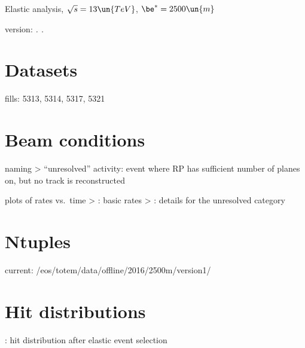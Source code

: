 


\def\baseDir{/afs/cern.ch/work/j/jkaspar/analyses/elastic/6500GeV/beta2500/4p/}


\centerline{\SetFontSizesXX Elastic analysis, $\sqrt s = 13\un{TeV}$, $\be^* = 2500\un{m}$ }
\vskip2mm
\centerline{version: {\it \number\day. \number\month. \number\year}}

\section{Datasets}

\> fills: 5313, 5314, 5317, 5321

\section{Beam conditions}

\> naming
\>> ``unresolved'' activity: event where RP has sufficient number of planes on, but no track is reconstructed

\> plots of rates vs.~time
\>> : basic rates
\>> : details for the unresolved category


\section{Ntuples}

\> current: /eos/totem/data/offline/2016/2500m/version1/

\section{Hit distributions}

\> : hit distribution after elastic event selection

